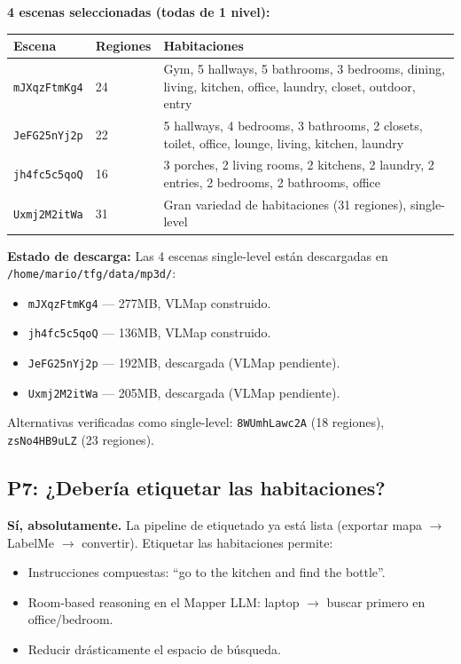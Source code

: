 \documentclass[11pt,a4paper]{article}
\begin{document}
\textbf{4 escenas seleccionadas (todas de 1 nivel):}

\begin{table}[h]
\centering
\small
\begin{tabular}{llp{7cm}}
\toprule
\textbf{Escena} & \textbf{Regiones} & \textbf{Habitaciones} \\
\midrule
\texttt{mJXqzFtmKg4} & 24 & Gym, 5 hallways, 5 bathrooms, 3 bedrooms, dining, living, kitchen, office, laundry, closet, outdoor, entry \\
\texttt{JeFG25nYj2p} & 22 & 5 hallways, 4 bedrooms, 3 bathrooms, 2 closets, toilet, office, lounge, living, kitchen, laundry \\
\texttt{jh4fc5c5qoQ} & 16 & 3 porches, 2 living rooms, 2 kitchens, 2 laundry, 2 entries, 2 bedrooms, 2 bathrooms, office \\
\texttt{Uxmj2M2itWa} & 31 & Gran variedad de habitaciones (31 regiones), single-level \\
\bottomrule
\end{tabular}
\end{table}

\textbf{Estado de descarga:} Las 4 escenas single-level están descargadas en \texttt{/home/mario/tfg/data/mp3d/}:
\begin{itemize}
    \item \texttt{mJXqzFtmKg4} --- 277MB, VLMap construido.
    \item \texttt{jh4fc5c5qoQ} --- 136MB, VLMap construido.
    \item \texttt{JeFG25nYj2p} --- 192MB, descargada (VLMap pendiente).
    \item \texttt{Uxmj2M2itWa} --- 205MB, descargada (VLMap pendiente).
\end{itemize}

Alternativas verificadas como single-level: \texttt{8WUmhLawc2A} (18 regiones), \texttt{zsNo4HB9uLZ} (23 regiones).

\subsection{P7: ¿Debería etiquetar las habitaciones?}

\textbf{Sí, absolutamente.} La pipeline de etiquetado ya está lista (exportar mapa $\rightarrow$ LabelMe $\rightarrow$ convertir). Etiquetar las habitaciones permite:
\begin{itemize}
    \item Instrucciones compuestas: ``go to the kitchen and find the bottle''.
    \item Room-based reasoning en el Mapper LLM: laptop $\rightarrow$ buscar primero en office/bedroom.
    \item Reducir drásticamente el espacio de búsqueda.
\end{itemize}
\end{document}
